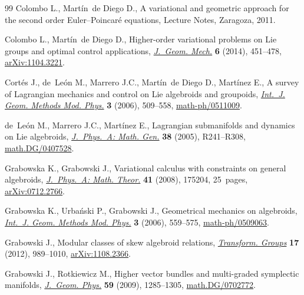 \begin{thebibliography}{99}
Colombo L., Mart\'{i}n~de Diego D., A variational and geometric approach for
 the second order {E}uler--{P}oincar\'{e} equations, {L}ecture {N}otes,
 Zaragoza, 2011.

Colombo L., Mart\'{i}n~de Diego D., Higher-order variational problems on {L}ie
 groups and optimal control applications, \href{https://doi.org/10.3934/jgm.2014.6.451}{\textit{J.~Geom. Mech.}} \textbf{6}
 (2014), 451--478, \href{https://arxiv.org/abs/1104.3221}{arXiv:1104.3221}.

Cort\'{e}s J., de~Le\'{o}n M., Marrero J.C., Mart\'{i}n~de Diego D.,
 Mart\'{i}nez E., A survey of {L}agrangian mecha\-nics and control on {L}ie
 algebroids and groupoids, \href{https://doi.org/10.1142/S0219887806001211}{\textit{Int.~J. Geom. Methods Mod. Phys.}}
 \textbf{3} (2006), 509--558, \mbox{\href{https://arxiv.org/abs/math-ph/0511009}{math-ph/0511009}}.

de~Le\'{o}n M., Marrero J.C., Mart\'{i}nez E., Lagrangian submanifolds and
 dynamics on {L}ie algebroids, \href{https://doi.org/10.1088/0305-4470/38/24/R01}{\textit{J.~Phys.~A: Math. Gen.}} \textbf{38}
 (2005), R241--R308, \href{https://arxiv.org/abs/math.DG/0407528}{math.DG/0407528}.

Grabowska K., Grabowski J., Variational calculus with constraints on general
 algebroids, \href{https://doi.org/10.1088/1751-8113/41/17/175204}{\textit{J.~Phys.~A: Math. Theor.}} \textbf{41} (2008), 175204,
 25~pages, \href{https://arxiv.org/abs/0712.2766}{arXiv:0712.2766}.

Grabowska K., Urba\'{n}ski P., Grabowski J., Geometrical mechanics on
 algebroids, \href{https://doi.org/10.1142/S0219887806001259}{\textit{Int.~J. Geom. Methods Mod. Phys.}} \textbf{3} (2006),
 559--575, \href{https://arxiv.org/abs/math-ph/0509063}{math-ph/0509063}.

Grabowski J., Modular classes of skew algebroid relations, \href{https://doi.org/10.1007/s00031-012-9197-2}{\textit{Transform.
 Groups}} \textbf{17} (2012), 989--1010, \href{https://arxiv.org/abs/1108.2366}{arXiv:1108.2366}.

Grabowski J., Rotkiewicz M., Higher vector bundles and multi-graded symplectic
 manifolds, \href{https://doi.org/10.1016/j.geomphys.2009.06.009}{\textit{J.~Geom. Phys.}} \textbf{59} (2009), 1285--1305,
 \href{https://arxiv.org/abs/math.DG/0702772}{math.DG/0702772}.


\end{thebibliography}
